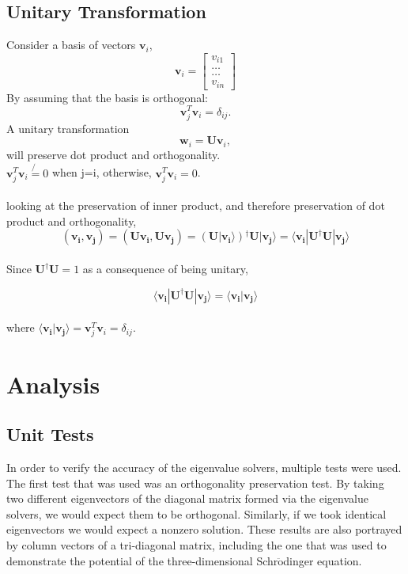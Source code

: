\documentclass[%
reprint,
superscriptaddress,
showpacs,
nofootinbib,
bibnotes,amsmath,amssymb,aps,
prc, 
]{revtex4-1}
\begin{document}
	\subsection{Unitary Transformation}
	Consider a basis of vectors $\mathbf{v}_i$,
	\[
	\mathbf{v}_i = \begin{bmatrix} v_{i1} \\ \dots \\ \dots \\v_{in} \end{bmatrix}
	\]
	By assuming that the basis is orthogonal:
	\[
	\mathbf{v}_j^T\mathbf{v}_i = \delta_{ij}.
	\]
	A unitary transformation
	\[
	\mathbf{w}_i=\mathbf{U}\mathbf{v}_i,
	\]
	will preserve dot product and orthogonality. \\
	
	$\mathbf{v}_j^T\mathbf{v}_i \not{=} 0 $ when j=i, 
	otherwise, $\mathbf{v}_j^T\mathbf{v}_i = 0$.
	\\ \\
	looking at the preservation of inner product, and therefore preservation of dot product and orthogonality, \\
	\begin{equation*}
		(\boldsymbol{v_{i}},\boldsymbol{v_{j}})=(\boldsymbol{Uv_{i}},\boldsymbol{Uv_{j}}) = (\boldsymbol{U|v_{i}}\rangle)  \boldsymbol{ ^\dagger U|v_{j}}\rangle =\langle \boldsymbol{v_{i}}|\boldsymbol{U^\dagger U}|\boldsymbol{v_{j}}\rangle
	\end{equation*} 
	\\
	Since $\boldsymbol{U^\dagger U}= 1 $ as a consequence of being unitary,
	
	\begin{equation*}
		\langle \boldsymbol{v_{i}}|\boldsymbol{U^\dagger U}|\boldsymbol{v_{j}}\rangle = \langle\boldsymbol{v_{i}|v_{j}} \rangle
	\end{equation*}
	\\
	where $\langle\boldsymbol{v_{i}|v_{j}} \rangle = \mathbf{v}_j^T\mathbf{v}_i = \delta_{ij}.$
	
	\section{Analysis}
	
	\subsection{Unit Tests}
	In order to verify the accuracy of the eigenvalue solvers, multiple tests were used.  The first test that was used was an orthogonality preservation test.  By taking two different eigenvectors of the diagonal matrix formed via the eigenvalue solvers, we would expect them to be orthogonal.  Similarly, if we took identical eigenvectors we would expect a nonzero solution.  These results are also portrayed by column vectors of a tri-diagonal matrix, including the one that was used to demonstrate the potential of the three-dimensional Schr$\ddot{\textrm{o}}$dinger equation.
	
\end{document}
